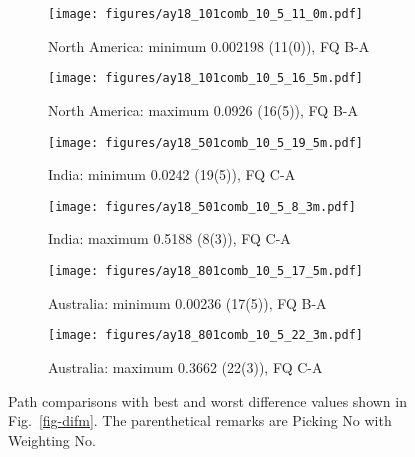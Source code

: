 \begin{figure*}
	\centering
	\begin{subfigure}{.42\textwidth}
		\texttt{[image: figures/ay18\_101comb\_10\_5\_11\_0m.pdf]}
		\caption{North America: minimum 0.002198 (11(0)), FQ B-A}\label{fig-nac-105110m}
	\end{subfigure}
	\begin{subfigure}{.42\textwidth}
		\texttt{[image: figures/ay18\_101comb\_10\_5\_16\_5m.pdf]}
		\caption{North America: maximum 0.0926 (16(5)), FQ B-A}\label{fig-nac-105165m}
	\end{subfigure}
	\vspace{.1em}
	\begin{subfigure}{.42\textwidth}
		\texttt{[image: figures/ay18\_501comb\_10\_5\_19\_5m.pdf]}
		\caption{India: minimum 0.0242 (19(5)), FQ C-A}\label{fig-ind-105195m}
	\end{subfigure}
	\begin{subfigure}{.42\textwidth}
		\texttt{[image: figures/ay18\_501comb\_10\_5\_8\_3m.pdf]}
		\caption{India: maximum 0.5188 (8(3)), FQ C-A}\label{fig-ind-10583m}
	\end{subfigure}
	\vspace{.1em}
	\begin{subfigure}{.42\textwidth}
		\texttt{[image: figures/ay18\_801comb\_10\_5\_17\_5m.pdf]}
		\caption{Australia: minimum 0.00236 (17(5)), FQ B-A}\label{fig-au-105175m}
	\end{subfigure}
	\begin{subfigure}{.42\textwidth}
		\texttt{[image: figures/ay18\_801comb\_10\_5\_22\_3m.pdf]}
		\caption{Australia: maximum 0.3662 (22(3)), FQ C-A}\label{fig-au-105223m}
	\end{subfigure}
	\caption[Best and worst differences (10 Myr bin, 5 Myr
step)]{Path comparisons with best and worst difference values shown in
Fig.~\ref{fig-difm}. The parenthetical remarks are Picking No with Weighting
No.}\label{fig-difbwm}
\end{figure*}

